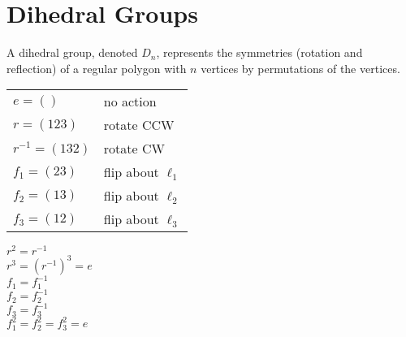\documentclass[letterpaper,12pt,fleqn]{article}
\begin{document}
\section*{Dihedral Groups}

\begin{definition}
  A dihedral group, denoted $D_n$, represents the symmetries (rotation and
  reflection) of a regular polygon with $n$ vertices by permutations of the
  vertices.
\end{definition}

\begin{example}[$D_3$]
  \begin{minipage}{3in}
  \end{minipage}
  \begin{minipage}{3in}
    \begin{tabular}{ll}
      $e=()$ & no action \\
      $r=(123)$ & rotate CCW \\
      $r^{-1}=(132)$ & rotate CW \\
      $f_1=(23)$ & flip about $\ell_1$ \\
      $f_2=(13)$ & flip about $\ell_2$ \\
      $f_3=(12)$ & flip about $\ell_3$ \\
    \end{tabular}
  \end{minipage}

  $r^2=r^{-1}$ \\
  $r^3=(r^{-1})^3=e$ \\
  $f_1=f_1^{-1}$ \\
  $f_2=f_2^{-1}$ \\
  $f_3=f_3^{-1}$ \\
  $f_1^2=f_2^2=f_3^2=e$
\end{example}
\end{document}
